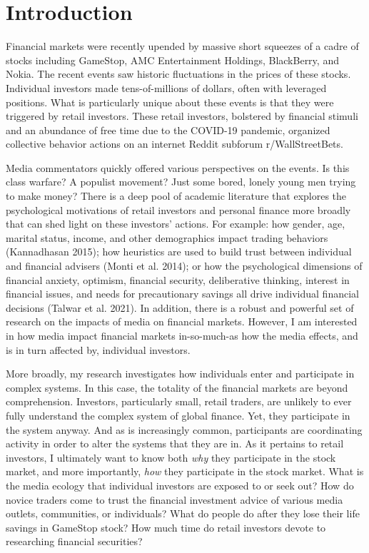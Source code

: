 \documentclass[12pt,]{article}
\begin{document}
\hypertarget{introduction}{%
\section{Introduction}\label{introduction}}

Financial markets were recently upended by massive short squeezes of a
cadre of stocks including GameStop, AMC Entertainment Holdings,
BlackBerry, and Nokia. The recent events saw historic fluctuations in
the prices of these stocks. Individual investors made tens-of-millions
of dollars, often with leveraged positions. What is particularly unique
about these events is that they were triggered by retail investors.
These retail investors, bolstered by financial stimuli and an abundance
of free time due to the COVID-19 pandemic, organized collective behavior
actions on an internet Reddit subforum r/WallStreetBets.

Media commentators quickly offered various perspectives on the events.
Is this class warfare? A populist movement? Just some bored, lonely
young men trying to make money? There is a deep pool of academic
literature that explores the psychological motivations of retail
investors and personal finance more broadly that can shed light on these
investors' actions. For example: how gender, age, marital status,
income, and other demographics impact trading behaviors (Kannadhasan
2015); how heuristics are used to build trust between individual and
financial advisers (Monti et al. 2014); or how the psychological
dimensions of financial anxiety, optimism, financial security,
deliberative thinking, interest in financial issues, and needs for
precautionary savings all drive individual financial decisions (Talwar
et al. 2021). In addition, there is a robust and powerful set of
research on the impacts of media on financial markets. However, I am
interested in how media impact financial markets in-so-much-as how the
media effects, and is in turn affected by, individual investors.

More broadly, my research investigates how individuals enter and
participate in complex systems. In this case, the totality of the
financial markets are beyond comprehension. Investors, particularly
small, retail traders, are unlikely to ever fully understand the complex
system of global finance. Yet, they participate in the system anyway.
And as is increasingly common, participants are coordinating activity in
order to alter the systems that they are in. As it pertains to retail
investors, I ultimately want to know both \emph{why} they participate in
the stock market, and more importantly, \emph{how} they participate in
the stock market. What is the media ecology that individual investors
are exposed to or seek out? How do novice traders come to trust the
financial investment advice of various media outlets, communities, or
individuals? What do people do after they lose their life savings in
GameStop stock? How much time do retail investors devote to researching
financial securities?
\end{document}
